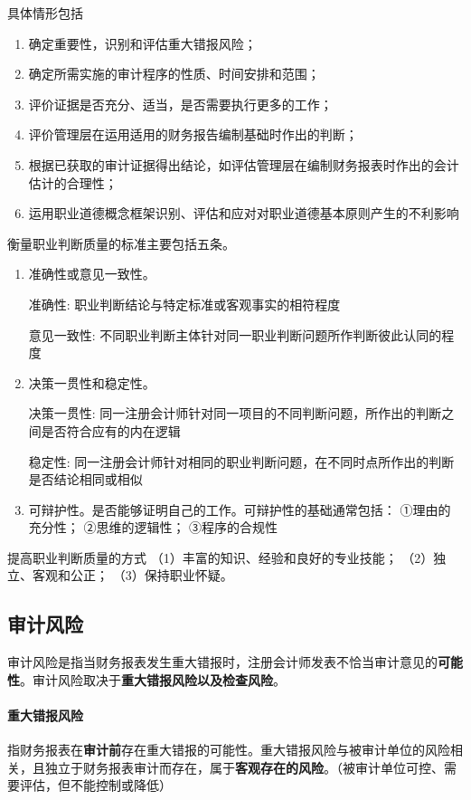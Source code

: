 \documentclass[UTF8,12pt]{ctexart}
\numberwithin{equation}{section} %
\numberwithin{figure}{section}
\numberwithin{table}{section}
\begin{document}
	具体情形包括
	\begin{enumerate}
		\item 确定重要性，识别和评估重大错报风险；

		\item 确定所需实施的审计程序的性质、时间安排和范围；

		\item 评价证据是否充分、适当，是否需要执行更多的工作；

		\item 评价管理层在运用适用的财务报告编制基础时作出的判断；

		\item 根据已获取的审计证据得出结论，如评估管理层在编制财务报表时作出的会计估计的合理性；

		\item 运用职业道德概念框架识别、评估和应对对职业道德基本原则产生的不利影响
	\end{enumerate}
	
	衡量职业判断质量的标准主要包括五条。
	\begin{enumerate}
		\item 准确性或意见一致性。
		
		准确性:
		职业判断结论与特定标准或客观事实的相符程度
		
		意见一致性:
		不同职业判断主体针对同一职业判断问题所作判断彼此认同的程度
		
		\item 决策一贯性和稳定性。
		
		决策一贯性:
		同一注册会计师针对同一项目的不同判断问题，所作出的判断之间是否符合应有的内在逻辑
		
		稳定性:
		同一注册会计师针对相同的职业判断问题，在不同时点所作出的判断是否结论相同或相似
		
		\item 可辩护性。是否能够证明自己的工作。可辩护性的基础通常包括：
		①理由的充分性；
		②思维的逻辑性；
		③程序的合规性
	\end{enumerate}
	
	提高职业判断质量的方式
	（1）丰富的知识、经验和良好的专业技能；
	（2）独立、客观和公正；
	（3）保持职业怀疑。

	\subsection{审计风险}
	审计风险是指当财务报表发生重大错报时，注册会计师发表不恰当审计意见的\textbf{可能性}。审计风险取决于\textbf{重大错报风险以及检查风险}。
	
	\paragraph{重大错报风险}
	指财务报表在\textbf{审计前}存在重大错报的可能性。重大错报风险与被审计单位的风险相关，且独立于财务报表审计而存在，属于\textbf{客观存在的风险}。（被审计单位可控、需要评估，但不能控制或降低）
	
\end{document}
